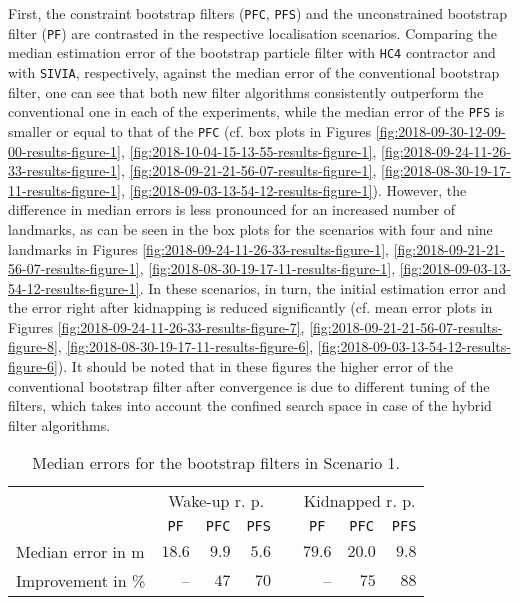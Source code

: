 First, the constraint bootstrap filters (\texttt{PFC}, \texttt{PFS}) and the unconstrained bootstrap filter (\texttt{PF}) are contrasted in the respective localisation scenarios. Comparing the median estimation error of the bootstrap particle filter with \texttt{HC4} contractor and with \texttt{SIVIA}, respectively, against the median error of the conventional bootstrap filter, one can see that both new filter algorithms consistently outperform the conventional one in each of the experiments, while the median error of the \texttt{PFS} is smaller or equal to that of the \texttt{PFC} (cf. box plots in Figures \ref{fig:2018-09-30-12-09-00-results-figure-1}, \ref{fig:2018-10-04-15-13-55-results-figure-1}, \ref{fig:2018-09-24-11-26-33-results-figure-1}, \ref{fig:2018-09-21-21-56-07-results-figure-1}, \ref{fig:2018-08-30-19-17-11-results-figure-1}, \ref{fig:2018-09-03-13-54-12-results-figure-1}). However, the difference in median errors is less pronounced for an increased number of landmarks, as can be seen in the box plots for the scenarios with four and nine landmarks in Figures \ref{fig:2018-09-24-11-26-33-results-figure-1}, \ref{fig:2018-09-21-21-56-07-results-figure-1}, \ref{fig:2018-08-30-19-17-11-results-figure-1}, \ref{fig:2018-09-03-13-54-12-results-figure-1}. In these scenarios, in turn, the initial estimation error and the error right after kidnapping is reduced significantly (cf. mean error plots in Figures \ref{fig:2018-09-24-11-26-33-results-figure-7}, \ref{fig:2018-09-21-21-56-07-results-figure-8}, \ref{fig:2018-08-30-19-17-11-results-figure-6}, \ref{fig:2018-09-03-13-54-12-results-figure-6}). It should be noted that in these figures the higher error of the conventional bootstrap filter after convergence is due to different tuning of the filters, which takes into account the confined search space in case of the hybrid filter algorithms.

\begin{table*}\centering
{}
\begin{tabular}{@{}lrrrrrrr@{}}\toprule
& \multicolumn{3}{c}{Wake-up r. p.} & \phantom{a} & \multicolumn{3}{c}{Kidnapped r. p.} \\ 
\cmidrule{2-4} \cmidrule{6-8}
 & \multicolumn{1}{c}{\texttt{PF}} & \multicolumn{1}{c}{\texttt{PFC}} & \multicolumn{1}{c}{\texttt{PFS}} & & \multicolumn{1}{c}{\texttt{PF}} & \multicolumn{1}{c}{\texttt{PFC}} & \multicolumn{1}{c}{\texttt{PFS}} \\
\midrule 
Median error in m & $18.6$ & $9.9$ & $5.6$ & & $79.6$ & $20.0$ & $9.8$ \\              
Improvement in \%  & -- & $47$ & $70$ & & -- & $75$ & $88$ \\ 
\bottomrule
\end{tabular}
\caption{Median errors for the bootstrap filters in Scenario 1.}
\label{tab:median_scenario1}
\end{table*}

